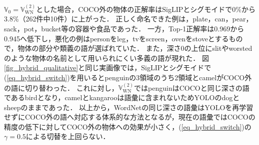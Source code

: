 $ {\mathbb V}_0 = {\mathbb V}_{\mathrm{WN}}^{(2)} $とした場合，COCO外の物体の正解率はSigLIPとシグモイドで0\%から3.8\%（262件中10件）に上がった．
正しく命名できた例は，plate，can，pear，sack，pot，bucket等の容器や食品であった．
一方，Top-1正解率は0.969から0.945へ低下し，悪化の例はpersonをleg，tvをscreen，ovenをstoveとするもので，物体の部分や類義の語が選ばれていた．
また，深さ0の上位にslitやworstedのような物体の名前として用いられにくい多義の語が現れた．
図\ref{fig_hybrid_qualitative}と同じ実画像では，SigLIPとシグモイドで(\ref{eq_hybrid_switch})を用いるとpenguinの3領域のうち2領域とcamelがCOCO外の語に切り替わった．
これに対し，$ {\mathbb V}_{\mathrm{WN}}^{(2)} $ではpenguinはCOCOと同じ深さの語であるbirdとなり，camelとkangarooは語彙に含まれないためYOLOのdogとsheepのままであった．
以上から，WordNetの同じ深さの語彙はYOLOを再学習せずにCOCO外の語へ対応する体系的な方法となるが，現在の語彙ではCOCOの精度の低下に対してCOCO外の物体への効果が小さく，(\ref{eq_hybrid_switch})の$ \gamma = 0.5 $による切替を上回らない．
\endgroup
